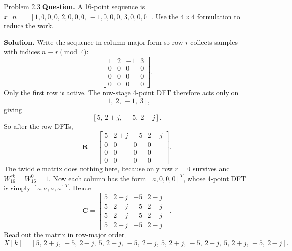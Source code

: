 \documentclass[10pt]{article}
\newcommand{\Prompt}[1]{\textbf{Question.} #1}
\newcommand{\SketchLabel}{\tcblower\textbf{Solution.}}
\begin{document}
\begin{examplebox}{Problem 2.3}
  \Prompt{A 16-point sequence is \(x[n]=[1,0,0,0,\,2,0,0,0,\,-1,0,0,0,\,3,0,0,0]\). Use the \(4\times 4\) formulation to reduce the work.}

  \medskip
  \SketchLabel{}
  Write the sequence in column-major form so row \(r\) collects samples with indices \(n\equiv r\pmod 4\):
  \[
    \begin{bmatrix}
      1&2&-1&3\\
      0&0&0&0\\
      0&0&0&0\\
      0&0&0&0
    \end{bmatrix}.
  \]
  Only the first row is active. The row-stage 4-point DFT therefore acts only on
  \[
    [1,\ 2,\ -1,\ 3],
  \]
  giving
  \[
    [5,\ 2+j,\ -5,\ 2-j].
  \]
  So after the row DFTs,
  \[
    \mathbf{R}=
    \begin{bmatrix}
      5&2+j&-5&2-j\\
      0&0&0&0\\
      0&0&0&0\\
      0&0&0&0
    \end{bmatrix}.
  \]
  The twiddle matrix does nothing here, because only row \(r=0\) survives and \(W_{16}^{rk}=W_{16}^{0}=1\).
  Now each column has the form \([a,0,0,0]^T\), whose 4-point DFT is simply \([a,a,a,a]^T\). Hence
  \[
    \mathbf{C}=
    \begin{bmatrix}
      5&2+j&-5&2-j\\
      5&2+j&-5&2-j\\
      5&2+j&-5&2-j\\
      5&2+j&-5&2-j
    \end{bmatrix}.
  \]
  Read out the matrix in row-major order,
  \[
    X[k]=[5,\ 2+j,\ -5,\ 2-j,\ 5,\ 2+j,\ -5,\ 2-j,\ 5,\ 2+j,\ -5,\ 2-j,\ 5,\ 2+j,\ -5,\ 2-j].
  \]


\end{examplebox}
\end{document}
